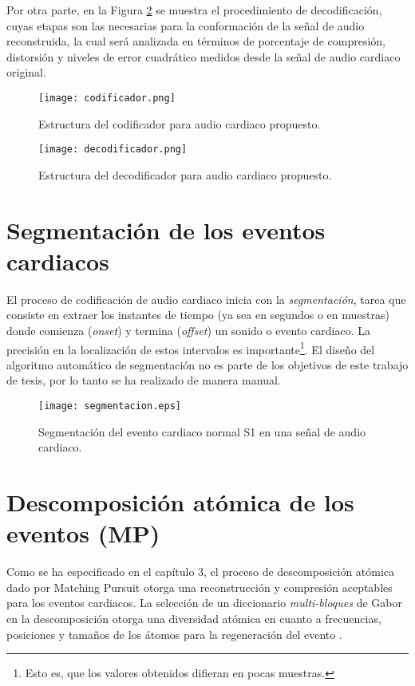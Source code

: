 Por otra parte, en la Figura \ref{diagDecod} se muestra el procedimiento de decodificación, cuyas etapas son las necesarias para la conformación de la señal de audio reconstruida, la cual será analizada en términos de porcentaje de compresión, distorsión y niveles de error cuadrático medidos desde la señal de audio cardiaco original. 
\begin{figure}[h!]
  \centering
  \texttt{[image: codificador.png]}
  \caption{Estructura del codificador para audio cardiaco propuesto.}
  \label{diagEncod}
\end{figure}
\begin{figure}[h!]
  \centering
  \texttt{[image: decodificador.png]}
  \caption{Estructura del decodificador para audio cardiaco propuesto.}
  \label{diagDecod}
\end{figure}
\section{Segmentación de los eventos cardiacos}
El proceso de codificación de audio cardiaco inicia con la \emph{segmentación}, tarea que consiste en extraer los instantes de tiempo (ya sea en segundos o en muestras) donde comienza (\emph{onset}) y termina (\emph{offset}) un sonido o evento cardiaco. La precisión en la localización de estos intervalos es importante\footnote{Esto es, que los valores obtenidos difieran en pocas muestras.}. El diseño del algoritmo automático de segmentación no es parte de los objetivos de este trabajo de tesis, por lo tanto se ha realizado de manera manual.
\begin{figure}[ht]
  \centering
  \texttt{[image: segmentacion.eps]}
  \caption{Segmentación del evento cardiaco normal S1 en una señal de audio cardiaco.}
  \label{segment}
\end{figure}
\section{Descomposición atómica de los eventos (MP)}
Como se ha especificado en el capítulo 3, el proceso de descomposición atómica dado por Matching Pursuit otorga una reconstrucción y compresión aceptables para los eventos cardiacos. La selección de un diccionario \emph{multi-bloques} de Gabor en la descomposición otorga una diversidad atómica en cuanto a frecuencias, posiciones y tamaños de los átomos para la regeneración del evento \cite[]{Nieblas2014}.

